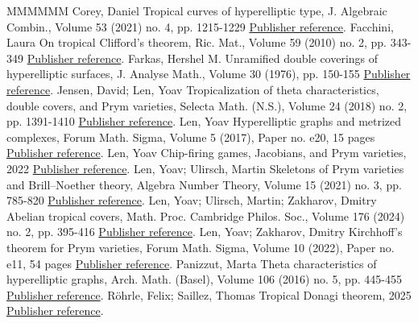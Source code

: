 \documentclass[11pt]{article}
\theoremstyle{definition}
\numberwithin{equation}{section}
\theoremstyle{definition}
\begin{document}
\begin{thebibliography}{MMMMMM}
 Corey, Daniel Tropical curves of hyperelliptic type, J. Algebraic Combin., Volume 53 (2021) no. 4, pp. 1215-1229 \href{https://alco.centre-mersenne.org/articles/10.5802/alco.452/#C}{Publisher reference}.
 Facchini, Laura On tropical Clifford’s theorem, Ric. Mat., Volume 59 (2010) no. 2, pp. 343-349 \href{https://alco.centre-mersenne.org/articles/10.5802/alco.452/#Facchini_Clifford}{Publisher reference}.
 Farkas, Hershel M. Unramified double coverings of hyperelliptic surfaces, J. Analyse Math., Volume 30 (1976), pp. 150-155 \href{https://alco.centre-mersenne.org/articles/10.5802/alco.452/#HMfarkashypcovers}{Publisher reference}.
 Jensen, David; Len, Yoav Tropicalization of theta characteristics, double covers, and Prym varieties, Selecta Math. (N.S.), Volume 24 (2018) no. 2, pp. 1391-1410 \href{https://alco.centre-mersenne.org/articles/10.5802/alco.452/#JensenLen_thetachars}{Publisher reference}.
 Len, Yoav Hyperelliptic graphs and metrized complexes, Forum Math. Sigma, Volume 5 (2017), Paper no. e20, 15 pages \href{https://alco.centre-mersenne.org/articles/10.5802/alco.452/#Len_Clifford}{Publisher reference}.
 Len, Yoav Chip-firing games, Jacobians, and Prym varieties, 2022 \href{https://alco.centre-mersenne.org/articles/10.5802/alco.452/#Len_Survey}{Publisher reference}.
 Len, Yoav; Ulirsch, Martin Skeletons of Prym varieties and Brill–Noether theory, Algebra Number Theory, Volume 15 (2021) no. 3, pp. 785-820 \href{https://alco.centre-mersenne.org/articles/10.5802/alco.452/#LenUlirsch_Prym}{Publisher reference}.
 Len, Yoav; Ulirsch, Martin; Zakharov, Dmitry Abelian tropical covers, Math. Proc. Cambridge Philos. Soc., Volume 176 (2024) no. 2, pp. 395-416 \href{https://alco.centre-mersenne.org/articles/10.5802/alco.452/#LenUlirschZakharov_abelianCovers}{Publisher reference}.
 Len, Yoav; Zakharov, Dmitry Kirchhoff’s theorem for Prym varieties, Forum Math. Sigma, Volume 10 (2022), Paper no. e11, 54 pages \href{https://alco.centre-mersenne.org/articles/10.5802/alco.452/#LZ22}{Publisher reference}.
 Panizzut, Marta Theta characteristics of hyperelliptic graphs, Arch. Math. (Basel), Volume 106 (2016) no. 5, pp. 445-455 \href{https://alco.centre-mersenne.org/articles/10.5802/alco.452/#Panizzut}{Publisher reference}.
 Röhrle, Felix; Saillez, Thomas Tropical Donagi theorem, 2025 \href{https://alco.centre-mersenne.org/articles/10.5802/alco.452/#RohrleSaillez_Donagi}{Publisher reference}.

\end{thebibliography}
\end{document}
